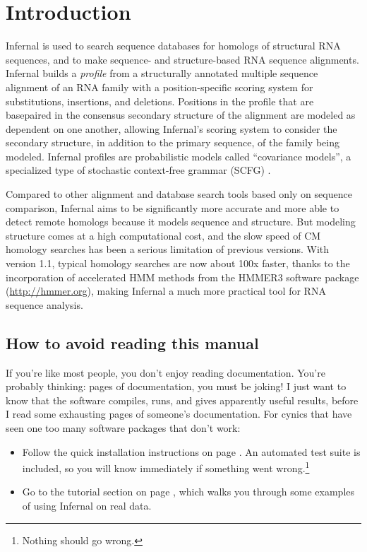 \section{Introduction}
\label{section:introduction}
\setcounter{footnote}{0}

Infernal is used to search sequence databases for homologs of
structural RNA sequences, and to make sequence- and structure-based
RNA sequence alignments. Infernal builds a \emph{profile} from a
structurally annotated multiple sequence alignment of an RNA family
with a position-specific scoring system for substitutions, insertions,
and deletions. Positions in the profile that are basepaired in the
consensus secondary structure of the alignment are modeled as
dependent on one another, allowing Infernal's scoring system to
consider the secondary structure, in addition to the primary sequence,
of the family being modeled. Infernal profiles are probabilistic
models called ``covariance models'', a specialized type of stochastic
context-free grammar (SCFG) \citep{Lari90}.

Compared to other alignment and database search tools based only on
sequence comparison, Infernal aims to be significantly more accurate
and more able to detect remote homologs because it models sequence
and structure. But modeling structure comes at a high computational
cost, and the slow speed of CM homology searches has been a serious
limitation of previous versions. With
version 1.1, typical homology searches are now about 100x faster,
thanks to the incorporation of accelerated HMM methods from the HMMER3
software package (\url{http://hmmer.org}), making Infernal a much more
practical tool for RNA sequence analysis.

\subsection{How to avoid reading this manual}

If you're like most people, you don't enjoy reading documentation.
You're probably thinking: \pageref{manualend} pages of documentation,
you must be joking! I just want to know that the software compiles,
runs, and gives apparently useful results, before I read some
\pageref{manualend} exhausting pages of someone's documentation. For
cynics that have seen one too many software packages that don't work:

\begin{itemize}
\item Follow the quick installation instructions on page
      \pageref{section:installation}. An automated test suite
      is included, so you will know immediately if something
      went wrong.\footnote{Nothing should go wrong.}
\item Go to the tutorial section on page
\pageref{section:tutorial}, which walks you through some examples of
using Infernal on real data.
\end{itemize}

